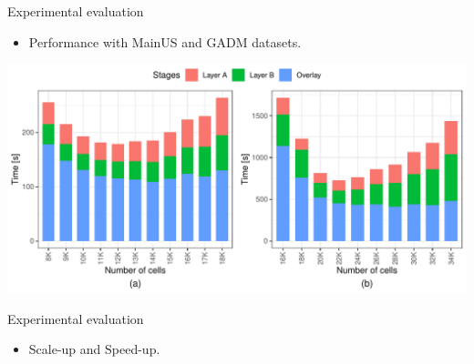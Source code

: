     \begin{frame}{Experimental evaluation}
        \begin{itemize}
            \item Performance with MainUS and GADM datasets.
        \end{itemize}
        \vspace{5mm}
        \includegraphics[width=\textwidth]{../thesis/chapterSDCEL/Performance/Performance}
    \end{frame}

    \begin{frame}{Experimental evaluation}
        \begin{itemize}
            \item Scale-up and Speed-up.
        \end{itemize}

    \end{frame}
    
